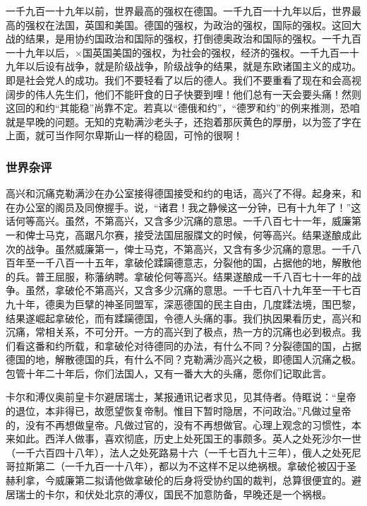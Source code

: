 一千九百一十九年以前，世界最高的强权在德国。一千九百一十九年以后，世界最高的强权在法国，英国和美国。德国的强权，为政治的强权，国际的强权。这回大战的结果，是用协约国政治和国际的强权，打倒德奥政治和国际的强权。一千九百一十九年以后，×国英国美国的强权，为社会的强权，经济的强权。一千九百一十九年以后设有战争，就是阶级战争，阶级战争的结果，就是东欧诸国主义的成功。即是社会党人的成功。我们不要轻看了以后的德人。我们不要重看了现在和会高视阔步的伟人先生们，他们不能旰食的日子快要到哩！他们总有一天会要头痛！然则这回的和约“其能稳”尚靠不定。若真以“德俄和约”，“德罗和约”的例来推测，恐咱就是早晚的问题。无知的克勒满沙老头子，还抱着那灰黄色的厚册，以为签了字在上面，就可当作阿尔卑斯山一样的稳固，可怜的很啊！

\subsubsection{世界杂评}

高兴和沉痛克勒满沙在办公室接得德国接受和约的电话，高兴了不得。起身来，和在办公室的阁员及同僚握手。说，“诸君！我之静候这一分钟，已有十九年了！”这话何等高兴。虽然，不第高兴，又含多少沉痛的意思。一千八百七十一年，威廉第一和俾士马克，高踞凡尔赛，接受法国屈服牒文的时候，何等高兴。结果遂酿成此次的战争。虽然威廉第一，俾士马克，不第高兴，又含有多少沉痛的意思。一千八百年至一千八百一十五年，拿破伦蹂躏德意志，分裂他的国，占据他的地，解散他的兵。普王屈服，称藩纳聘。拿破伦何等高兴。结果遂酿成一千八百七十一年的战争。虽然，拿破伦不第高兴，又含多少沉痛的意思。一千七百八十九年至一干七百九十年，德奥为巨擘的神圣同盟军，深恶德国的民主自由，几度蹂法境，围巴黎，结果遂崛起拿破伦，而有蹂躏德国，令德人头痛的事。我们执因果看历史，高兴和沉痛，常相关系，不可分开。一方的高兴到了极点，热一方的沉痛也必到极点。我们看这番和约所载，和拿破伦对待德同的办法，有什么不同？分裂德国的国，占据德国的地，解散德国的兵，有什么不同？克勒满沙高兴之极，即德国人沉痛之极。包管十年二十年后，你们法国人，又有一番大大的头痛，愿你们记取此言。

卡尔和溥仪奥前皇卡尔避居瑞士，某报通讯记者求见，见其侍者。侍眶说：“皇帝的退位，本非得已，故愿望恢复帝制。惟目下暂时隐居，不问政治。”凡做过皇帝的，没有不再想做皇帝。凡做过官的，没有不再想做官。心理上观念的习惯性，本来如此。西洋人做事，喜欢彻底，历史上处死国王的事颇多。英人之处死沙尔一世（一千六百四十八年），法人之处死路易十六（一千七百九十三年），俄人之处死尼哥拉斯第二（一千九百一十八年），都以为不这样不足以绝祸根。拿破伦被囚于圣赫利拿，今威廉第二拟请他做拿破伦的后身将受协约国的裁判，总算很便宜的。避居瑞士的卡尔，和伏处北京的溥仪，国民不加意防备，早晚还是一个祸根。

